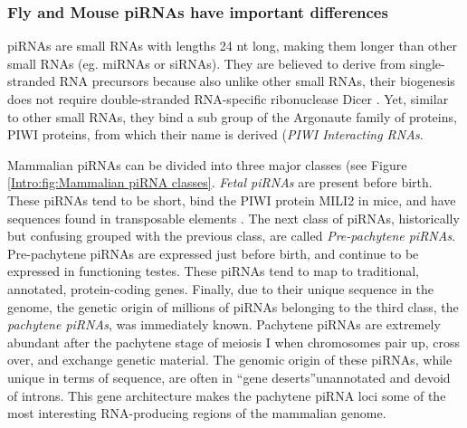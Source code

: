 {    \subsubsection{Fly and Mouse piRNAs have important differences}

      piRNAs are small RNAs with lengths 24 nt long, making them longer than other small RNAs (eg. miRNAs or siRNAs). They are believed to derive from single-stranded RNA precursors because also unlike other small RNAs, their biogenesis does not require double-stranded RNA-specific ribonuclease Dicer \citep{Vagin2006, Houwing2007}. Yet, similar to other small RNAs, they bind a sub group of the Argonaute family of proteins, PIWI proteins, from which their name is derived (\textit{PIWI Interacting RNAs}. 

      Mammalian piRNAs can be divided into three major classes (see Figure \ref{Intro:fig:Mammalian piRNA classes}. \textit{Fetal piRNAs} are present before birth. These piRNAs tend to be short, bind the PIWI protein MILI2 in mice, and have sequences found in transposable elements \citep{Carmell2007}. The next class of piRNAs, historically but confusing grouped with the previous class, are called \textit{Pre-pachytene piRNAs}. Pre-pachytene piRNAs are expressed just before birth, and continue to be expressed in functioning testes. These piRNAs tend to map to traditional, annotated, protein-coding genes. Finally, due to their unique sequence in the genome, the genetic origin of millions of piRNAs belonging to the third class, the \textit{pachytene piRNAs}, was immediately known. Pachytene piRNAs are extremely abundant after the pachytene stage of meiosis I when chromosomes pair up, cross over, and exchange genetic material. The genomic origin of these piRNAs, while unique in terms of sequence, are often in ``gene deserts''\textendash unannotated and devoid of introns. This gene architecture makes the pachytene piRNA loci some of the most interesting RNA-producing regions of the mammalian genome.

}
